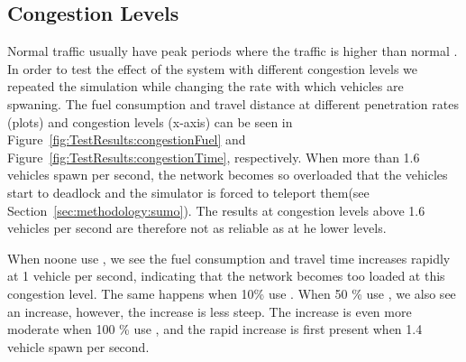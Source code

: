 \subsection{Congestion Levels}
Normal traffic usually have peak periods where the traffic is higher than normal \cite{Vejdir}. 
In order to test the effect of the system with different congestion levels we repeated the simulation while changing the rate with which vehicles are spwaning. 
The fuel consumption and travel distance at different penetration rates (plots) and congestion levels (x-axis) can be seen in Figure~\ref{fig:TestResults:congestionFuel} and Figure~\ref{fig:TestResults:congestionTime}, respectively. 
When more than 1.6 vehicles spawn per second, the network becomes so overloaded that the vehicles start to deadlock and the simulator is forced to teleport them(see Section~\ref{sec:methodology:sumo}).
The results at congestion levels above 1.6 vehicles per second are therefore not as reliable as at he lower levels.

When noone use \tech, we see the fuel consumption and travel time increases rapidly at 1 vehicle per second, indicating that the network becomes too loaded at this congestion level. 
The same happens when 10\% use \tech. 
When 50 \% use \tech, we also see an increase, however, the increase is less steep.
The increase is even more moderate when 100 \% use \tech, and the rapid increase is first present when 1.4 vehicle spawn per second.


